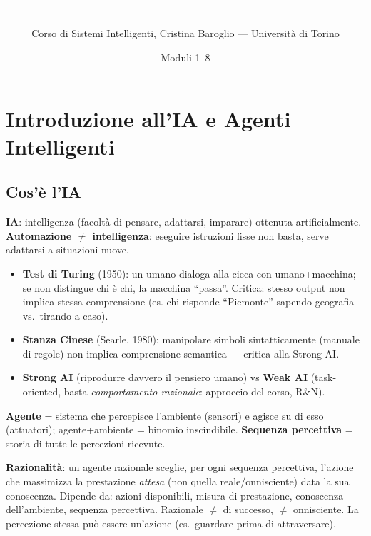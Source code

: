 \documentclass[10pt,a4paper]{article}
\title{\vspace{-1.2cm}{\large Sistemi Intelligenti --- Riassunto Compatto}\\[0.2cm]
  \rule{\linewidth}{1pt}}
\author{Corso di Sistemi Intelligenti, Cristina Baroglio --- Università di Torino}
\date{Moduli 1--8}
\begin{document}
\maketitle
\vspace{-0.8cm}
\tableofcontents

\section{Introduzione all'IA e Agenti Intelligenti}

\subsection{Cos'è l'IA}

\textbf{IA}: intelligenza (facoltà di pensare, adattarsi, imparare) ottenuta artificialmente. \textbf{Automazione $\neq$ intelligenza}: eseguire istruzioni fisse non basta, serve adattarsi a situazioni nuove.

\begin{itemize}
  \item \textbf{Test di Turing} (1950): un umano dialoga alla cieca con umano+macchina; se non distingue chi è chi, la macchina ``passa''. Critica: stesso output non implica stessa comprensione (es. chi risponde ``Piemonte'' sapendo geografia vs.\ tirando a caso).
  \item \textbf{Stanza Cinese} (Searle, 1980): manipolare simboli sintatticamente (manuale di regole) non implica comprensione semantica --- critica alla Strong AI.
  \item \textbf{Strong AI} (riprodurre davvero il pensiero umano) vs \textbf{Weak AI} (task-oriented, basta \emph{comportamento razionale}: approccio del corso, R\&N).
\end{itemize}

\textbf{Agente} = sistema che percepisce l'ambiente (sensori) e agisce su di esso (attuatori); agente+ambiente = binomio inscindibile. \textbf{Sequenza percettiva} = storia di tutte le percezioni ricevute.

\textbf{Razionalità}: un agente razionale sceglie, per ogni sequenza percettiva, l'azione che massimizza la prestazione \emph{attesa} (non quella reale/onnisciente) data la sua conoscenza. Dipende da: azioni disponibili, misura di prestazione, conoscenza dell'ambiente, sequenza percettiva. Razionale $\neq$ di successo, $\neq$ onnisciente. La percezione stessa può essere un'azione (es.\ guardare prima di attraversare).
\end{document}
